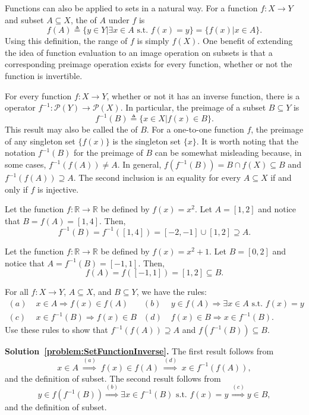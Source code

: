 Functions can also be applied to sets in a natural way.
For a function $f \colon X\rightarrow Y$ and subset $A\subseteq X$, the  of $A$ under $f$ is
\[ f(A) \triangleq \{ y\in Y | \exists x\in A \textrm{ s.t. } f(x)=y\} = \{f(x) | x\in A\}. \]
Using this definition, the range of $f$ is simply $f(X)$.
One benefit of extending the idea of function evaluation to an image operation on subsets is that a corresponding preimage operation exists for every function, whether or not the function is invertible.


For every function $f:X\to Y$, whether or not it has an inverse function, there is a  operator $f^{-1}:\mathcal P(Y)\to\mathcal P(X)$.
In particular, the preimage of a subset $B\subseteq Y$ is
\[ f^{-1}(B) \triangleq \{ x\in X | f(x)\in B\}. \]
This result may also be called the  of $B$.
For a one-to-one function $f$, the preimage of any singleton set $\{ f(x) \}$ is the singleton set $\{ x \}$.
It is worth noting that the notation $f^{-1}(B)$ for the preimage of $B$ can be somewhat misleading because, in some cases, $f^{-1}(f(A)) \neq A$.
In general, $f(f^{-1}(B))=B\cap f(X)\subseteq B$ and $f^{-1}(f(A))\supseteq A$.
The second inclusion is an equality for every $A\subseteq X$ if and only if $f$ is injective.

\begin{example}
Let the function $f \colon \mathbb{R} \rightarrow \mathbb{R}$ be defined by $f(x)=x^2$. Let $A=[1,2]$ and notice that $B = f(A) = [1,4]$.  Then,
\[ f^{-1}(B) = f^{-1}([1,4]) = [-2,-1] \cup [1,2] \supseteq A. \]
\end{example}
\begin{example}
Let the function $f \colon \mathbb{R} \rightarrow \mathbb{R}$ be defined by $f(x)=x^2+1$. Let $B=[0,2]$ and notice that $A = f^{-1}(B) = [-1,1]$.  Then,
\[ f(A) = f([-1,1]) = [1,2] \subseteq B. \]
\end{example}

\begin{problem}
\label{problem:SetFunctionInverse}
For all $f:X\rightarrow Y$, $A\subseteq X$, and $B\subseteq Y$, we have the rules:
\begin{align*}
(a) & \; x \in A \Rightarrow f(x) \in f(A) &
(b) & \; y \in f(A) \Rightarrow \exists x\in A \textrm{ s.t. } f(x)=y \\
(c) & \; x\in f^{-1}(B) \Rightarrow f(x) \in B &
(d) & \; f(x) \in B \Rightarrow x\in f^{-1}(B) .
\end{align*}
Use these rules to show that $f^{-1}(f(A)) \supseteq A$ and $f(f^{-1}(B)) \subseteq B$.
\end{problem}
\noindent \textbf{Solution~\ref{problem:SetFunctionInverse}.}
The first result follows from
\[ x\in A \; \stackrel{(a)}{\Rightarrow} \; f(x)\in f(A) \; \stackrel{(d)}{\Rightarrow} \; x\in f^{-1}(f(A)), \]
and the definition of subset.
The second result follows from
\[ y\in f(f^{-1}(B)) \stackrel{(b)}{\Rightarrow} \exists x\in f^{-1}(B) \textrm{ s.t. } f(x)=y \, \stackrel{(c)}{\Rightarrow} y\in B, \]
and the definition of subset.

